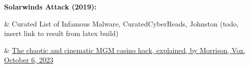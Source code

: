 \documentclass[a4paper]{article}
\begin{document}
	\noindent\textbf{Solarwinds Attack (2019):}
	\begin{easylist}[itemize]
	& Curated List of Infamous Malware, CuratedCyberReads, Johnston (todo, insert link to result from latex build)
	\end{easylist}

	\noindent{}
 	\begin{easylist}[itemize]
 	& \href{https://www.vox.com/technology/2023/9/15/23875113/mgm-hack-casino-vishing-cybersecurity-ransomware}{The chaotic and cinematic MGM casino hack, explained, by Morrison, Vox, October 6, 2023}
 	\end{easylist}
  
	\bigskip\noindent
\end{document}
